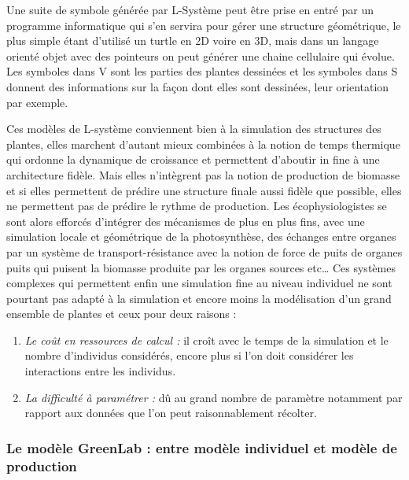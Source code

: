 {{{Une suite de symbole générée par L-Système peut être prise en entré par un programme informatique qui s’en servira pour gérer une structure géométrique, le plus simple étant d’utilisé un turtle en 2D voire en 3D, mais dans un langage orienté objet avec des pointeurs on peut générer une chaine cellulaire qui évolue. Les symboles dans V sont les parties des plantes dessinées et les symboles dans S donnent des informations sur la façon dont elles sont dessinées, leur orientation par exemple.
}   
}

Ces modèles de L-système conviennent bien à la simulation des structures des plantes, elles marchent d’autant mieux combinées à la notion de temps thermique qui ordonne la dynamique de croissance et permettent d’aboutir in fine à une architecture fidèle. Mais elles n’intègrent pas la notion de production de biomasse et si elles permettent de prédire une structure finale aussi fidèle que possible, elles ne permettent pas de prédire le rythme de production. Les écophysiologistes se sont alors efforcés d’intégrer des mécanismes de plus en plus fins, avec une simulation locale et géométrique de la photosynthèse, des échanges entre organes par un système de transport-résistance avec la notion de force de puits de organes puits qui puisent la biomasse produite par les organes sources etc… Ces systèmes complexes qui permettent enfin une simulation fine au niveau individuel ne sont pourtant pas adapté à la simulation et encore moins la modélisation d’un grand ensemble de plantes et ceux pour deux raisons : 
\begin{enumerate}
\item \emph{Le coût en ressources de calcul :} il croît avec le temps de la simulation et le nombre d’individus considérés, encore plus si l’on doit considérer les interactions entre les individus.
\item \emph{La difficulté à paramétrer :} dû au grand nombre de paramètre notamment par rapport aux données que l’on peut raisonnablement récolter.
\end{enumerate}

\subsubsection[Le modèle GreenLab]{Le modèle GreenLab : entre modèle individuel et modèle de production}

\begin{figure}[h]
	\begin{center}
	

\end{center}
\end{figure}}
